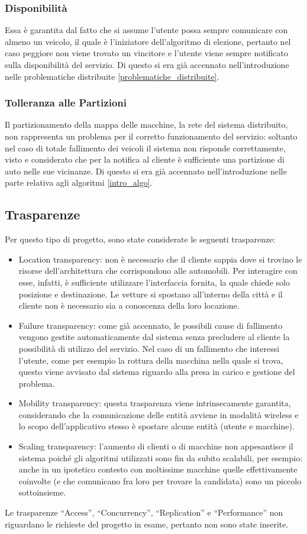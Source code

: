 \subsubsection{Disponibilità}
Essa è garantita dal fatto che si assume l'utente possa sempre comunicare con almeno un veicolo, il quale è l'iniziatore dell'algoritmo di elezione, pertanto nel caso peggiore non viene trovato un vincitore e l'utente viene sempre notificato sulla disponibilità del servizio. Di questo si era già accennato nell'introduzione nelle problematiche distribuite \ref{problematiche_distribuite}.

\subsubsection{Tolleranza alle Partizioni}
Il partizionamento della mappa delle macchine, la rete del sistema distribuito, non rappresenta un problema per il corretto funzionamento del servizio:  soltanto nel caso di totale fallimento dei veicoli il sistema non risponde correttamente, visto e considerato che per la notifica al cliente è sufficiente una partizione di auto nelle sue vicinanze. Di questo si era già accennato nell'introduzione nelle parte relativa agli algoritmi \ref{intro_algo}.

\subsection{Trasparenze} \label{req_trasparenze}

Per questo tipo di progetto, sono state considerate le seguenti trasparenze: 
\begin{itemize}
	\item Location transparency: non è necessario che il cliente sappia dove si trovino le risorse dell'architettura che corrispondono alle automobili. Per interagire con esse, infatti, è sufficiente utilizzare l'interfaccia fornita, la quale chiede solo posizione e destinazione. Le vetture si spostano all'interno della città e il cliente non è necessario sia a conoscenza della loro locazione.
	\item Failure transparency: come già accennato, le possibili cause di fallimento vengono gestite automaticamente dal sistema senza precludere al cliente la possibilità di utilizzo del servizio. Nel caso di un fallimento che interessi l'utente, come per esempio la rottura della macchina nella quale si trova, questo viene avvisato dal sistema riguardo alla presa in carico e gestione del problema.
	\item Mobility transparency: questa trasparenza viene intrinsecamente garantita, considerando che la comunicazione delle entità avviene in modalità wireless e lo scopo dell'applicativo stesso è spostare alcune entità (utente e macchine).
	\item Scaling transparency: l'aumento di clienti o di macchine non appesantisce il sistema poiché gli algoritmi utilizzati sono fin da subito scalabili, per esempio: anche in un ipotetico contesto con moltissime macchine quelle effettivamente coinvolte (e che comunicano fra loro per trovare la candidata) sono un piccolo sottoinsieme. 
\end{itemize}

Le trasparenze ``Access'', ``Concurrency'', ``Replication'' e ``Performance'' non riguardano le richieste del progetto in esame, pertanto non sono state inserite.
